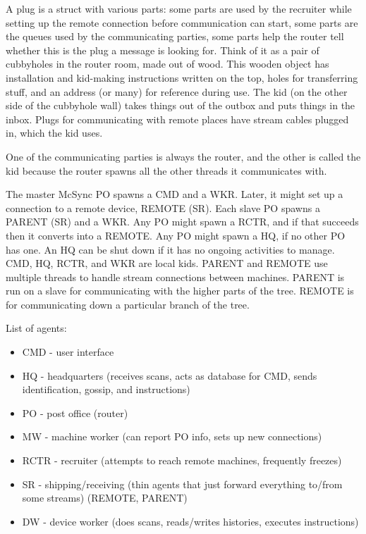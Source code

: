 \documentclass{book}
\begin{document}
A plug is a struct with various parts: some parts are used by the recruiter while setting up the remote connection before communication can start, some parts are the queues used by the communicating parties, some parts help the router tell whether this is the plug a message is looking for.  Think of it as a pair of cubbyholes in the router room, made out of wood.  This wooden object has installation and kid-making instructions written on the top, holes for transferring stuff, and an address (or many) for reference during use.  The kid (on the other side of the cubbyhole wall) takes things out of the outbox and puts things in the inbox.  Plugs for communicating with remote places have stream cables plugged in, which the kid uses.

One of the communicating parties is always the router, and the other is called the kid because the router spawns all the other threads it communicates with.

The master McSync PO spawns a CMD and a WKR.  Later, it might set up a connection to a remote device, REMOTE (SR).
Each slave PO spawns a PARENT (SR) and a WKR.
Any PO might spawn a RCTR, and if that succeeds then it converts into a REMOTE.
Any PO might spawn a HQ, if no other PO has one.  An HQ can be shut down if it has no ongoing activities to manage.
CMD, HQ, RCTR, and WKR are local kids.
PARENT and REMOTE use multiple threads to handle stream connections between machines.
   PARENT is run on a slave for communicating with the higher parts of the tree.
   REMOTE is for communicating down a particular branch of the tree.

List of agents:
\begin{itemize}
\item CMD - user interface
\item HQ - headquarters (receives scans, acts as database for CMD, sends identification, gossip, and instructions)
\item PO - post office (router)
\item MW - machine worker (can report PO info, sets up new connections)
\item RCTR - recruiter (attempts to reach remote machines, frequently freezes)
\item SR - shipping/receiving (thin agents that just forward everything to/from some streams) (REMOTE, PARENT)
\item DW - device worker (does scans, reads/writes histories, executes instructions)
\end{itemize}
\end{document}
